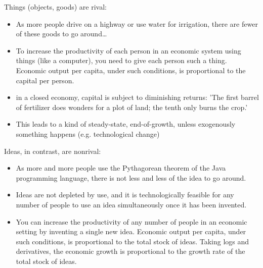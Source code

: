 Things (objects, goods) are rival:
\begin{itemize}
    \item As more people drive on a highway or use water for irrigation, there
        are fewer of these goods to go around\dots
    \item To increase the productivity of each person in an economic system using
        things (like a computer), you need to give each person such a thing.
        Economic output per capita, under such conditions, is proportional to
        the capital per person.
    \item in a closed economy, capital is subject to diminishing returns:
        'The first barrel of fertilizer does wonders for a plot of land; the
        tenth only burns the crop.'
    \item This leads to a kind of steady-state, end-of-growth, unless exogenously
        something happens (e.g. technological change)
\end{itemize}
Ideas, in contrast, are nonrival:
\begin{itemize}
    \item As more and more people use the Pythagorean theorem of the Java
        programming language, there is not less and less of the idea to go
        around.
    \item Ideas are not depleted by use, and it is technologically feasible
        for any number of people to use an idea simultaneously once it has
        been invented.
    \item You can increase the productivity of any number of people in an
        economic setting by inventing a single new idea. Economic output per
        capita, under such conditions, is proportional to the total stock of
        ideas. Taking logs and derivatives, the economic growth is proportional
        to the growth rate of the total stock of ideas.
\end{itemize}

